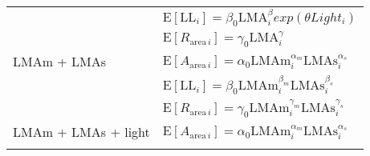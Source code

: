 \documentclass[
  12pt,
]{article}
\begin{document}
\begin{longtable}[]{@{}ll@{}}
\begin{minipage}[t]{0.14\columnwidth}
\strut
\end{minipage} & \begin{minipage}[t]{0.80\columnwidth}\raggedright
\(\mathrm{E}[\mathrm{LL}_i] = \beta_0\mathrm{LMA}_{i}^{\beta}exp(\theta Light_i)\)\strut
\end{minipage}\tabularnewline
\begin{minipage}[t]{0.14\columnwidth}\raggedright
\strut
\end{minipage} & \begin{minipage}[t]{0.80\columnwidth}\raggedright
\(\mathrm{E}[R_{\mathrm{area} \, i}] = \gamma_0\mathrm{LMA}_{i}^{\gamma}\)\strut
\end{minipage}\tabularnewline
\begin{minipage}[t]{0.14\columnwidth}\raggedright
LMAm + LMAs\strut
\end{minipage} & \begin{minipage}[t]{0.80\columnwidth}\raggedright
\(\mathrm{E}[A_{\mathrm{area} \, i}] = \alpha_0\mathrm{LMAm}_{i}^{\alpha_m} \mathrm{LMAs}_{i}^{\alpha_s}\)\strut
\end{minipage}\tabularnewline
\begin{minipage}[t]{0.14\columnwidth}\raggedright
\strut
\end{minipage} & \begin{minipage}[t]{0.80\columnwidth}\raggedright
\(\mathrm{E}[\mathrm{LL}_i] = \beta_0\mathrm{LMAm}_{i}^{\beta_m} \mathrm{LMAs}_{i}^{\beta_s}\)\strut
\end{minipage}\tabularnewline
\begin{minipage}[t]{0.14\columnwidth}\raggedright
\strut
\end{minipage} & \begin{minipage}[t]{0.80\columnwidth}\raggedright
\(\mathrm{E}[R_{\mathrm{area} \, i}] = \gamma_0\mathrm{LMAm}_{i}^{\gamma_m} \mathrm{LMAs}_{i}^{\gamma_s}\)\strut
\end{minipage}\tabularnewline
\begin{minipage}[t]{0.14\columnwidth}\raggedright
LMAm + LMAs + light\strut
\end{minipage} & \begin{minipage}[t]{0.80\columnwidth}\raggedright
\(\mathrm{E}[A_{\mathrm{area} \, i}]= \alpha_0\mathrm{LMAm}_{i}^{\alpha_m} \mathrm{LMAs}_{i}^{\alpha_s}\)\strut
\end{minipage}\tabularnewline
\begin{minipage}[t]{0.14\columnwidth}\raggedright
\strut
\end{minipage} & \begin{minipage}[t]{0.80\columnwidth}\raggedright

\end{minipage}
\end{longtable}
\end{document}
